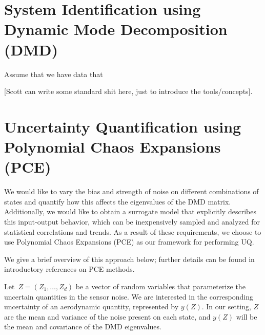 \documentclass{aiaa-tc}%
\begin{document}
\section{System Identification using Dynamic Mode Decomposition (DMD)}

Assume that we have data that 



[Scott can write some standard shit here, just to introduce the
  tools/concepts].

\section{Uncertainty Quantification using Polynomial Chaos Expansions (PCE)}

We would like to vary the bias and strength of noise on different
combinations of states and quantify how this affects the eigenvalues
of the DMD matrix. Additionally, we would like to obtain a surrogate
model that explicitly describes this input-output behavior, which can
be inexpensively sampled and analyzed for statistical correlations and
trends. As a result of these requirements, we choose to use Polynomial
Chaos Expansions (PCE) as our framework for performing UQ.

We give a brief overview of this approach below; further details can
be found in introductory references on PCE
methods\cite{ghanem_book,xiu_book,lemaitre}.

Let~$Z=(Z_1,\ldots,Z_d)$ be a vector of random variables that
parameterize the uncertain quantities in the sensor noise. We are
interested in the corresponding uncertainty of an aerodynamic
quantity, represented by $y(Z)$.  In our setting, $Z$ are the mean and
variance of the noise present on each state, and $y(Z)$ will be the
mean and covariance of the DMD eigenvalues.
\end{document}
